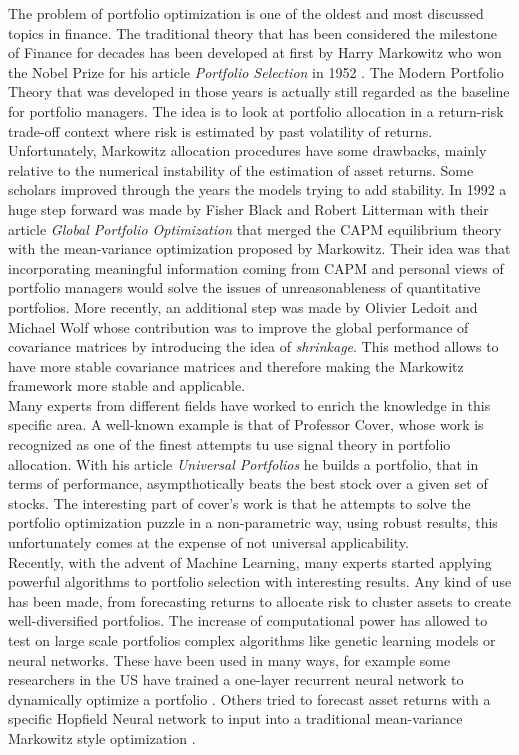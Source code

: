 \documentclass[12pt]{article} %
\numberwithin{equation}{subsection}
\begin{document}
The problem of portfolio optimization is one of the oldest and most discussed topics in finance. The traditional theory that has been considered the milestone of Finance for decades has been developed at first by Harry Markowitz who won the Nobel Prize for his article \textit{Portfolio Selection} in 1952 \cite{Markowitz}. The Modern Portfolio Theory that was developed in those years is actually still regarded as the baseline for portfolio managers. The idea is to look at portfolio allocation in a return-risk trade-off context where risk is estimated by past volatility of returns. Unfortunately, Markowitz allocation procedures have some drawbacks, mainly relative to the numerical instability of the estimation of asset returns. Some scholars improved through the years the models trying to add stability. In 1992 a huge step forward was made by Fisher Black and Robert Litterman with their article \textit{Global Portfolio Optimization} \cite{black_litterman} that merged the CAPM equilibrium theory with the mean-variance optimization proposed by Markowitz. Their idea was that incorporating meaningful information coming from CAPM and personal views of portfolio managers would solve the issues of unreasonableness of quantitative portfolios. More recently, an additional step was made by Olivier Ledoit and Michael Wolf whose contribution was to improve the global performance of covariance matrices by introducing the idea of \textit{shrinkage}. This method allows to have more stable covariance matrices and therefore making the Markowitz framework more stable and applicable.  \\
Many experts from different fields have worked to enrich the knowledge in this specific area. A well-known example is that of Professor Cover, whose work is recognized as one of the finest attempts tu use signal theory in portfolio allocation. With his article \textit{Universal Portfolios} \cite{universal_portfolios} he builds a portfolio, that in terms of performance, asympthotically beats the best stock over a given set of stocks. The interesting part of cover's work is that he attempts to solve the portfolio optimization puzzle in a non-parametric way, using robust results, this unfortunately comes at the expense of not universal applicability.\\
Recently, with the advent of Machine Learning, many experts started applying powerful algorithms to portfolio selection with interesting results. Any kind of use has been made, from forecasting returns to allocate risk to cluster assets to create well-diversified portfolios. The increase of computational power has allowed to test on large scale portfolios complex algorithms like genetic learning models or neural networks. These have been used in many ways, for example some researchers in the US have trained a one-layer recurrent neural network to dynamically optimize a portfolio \cite{NN_1}. Others tried to forecast asset returns with a specific Hopfield Neural network to input into a traditional mean-variance Markowitz style optimization \cite{NN_2}.\\
\end{document}
